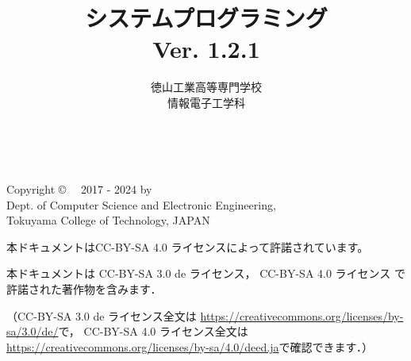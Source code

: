 \documentclass[a4paper,11pt,twocolumn]{ltjsbook}      %
\begin{document}
\frontmatter
\title{システムプログラミング\\Ver. 1.2.1}
\author{徳山工業高等専門学校\\情報電子工学科}
\date{}
\maketitle

\thispagestyle{empty}
\onecolumn
~
\vfill
\begin{flushleft}
Copyright \copyright ~~ 2017 - 2024 by \\
Dept. of Computer Science and Electronic Engineering, \\
Tokuyama College of Technology, JAPAN
\end{flushleft}

\vspace{0.8cm}
本ドキュメントはCC-BY-SA 4.0 ライセンスによって許諾されています。

本ドキュメントは
CC-BY-SA 3.0 de ライセンス，
CC-BY-SA 4.0 ライセンス
で許諾された著作物を含みます．

（CC-BY-SA 3.0 de ライセンス全文は
\url{https://creativecommons.org/licenses/by-sa/3.0/de/}で，
CC-BY-SA 4.0 ライセンス全文は
\url{https://creativecommons.org/licenses/by-sa/4.0/deed.ja}で確認できます．）

\setcounter{tocdepth}{2}
\tableofcontents

\mainmatter

\end{document}
